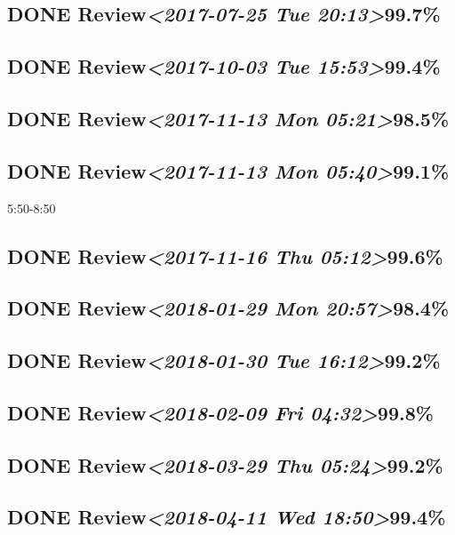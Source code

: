\documentclass[11pt]{ctexart}
\begin{document}
\subsection{{\bfseries\sffamily DONE} Review\textit{<2017-07-25 Tue 20:13>}99.7\%}
\label{sec:org71109af}
\subsection{{\bfseries\sffamily DONE} Review\textit{<2017-10-03 Tue 15:53>}99.4\%}
\label{sec:org5db7d38}

\subsection{{\bfseries\sffamily DONE} Review\textit{<2017-11-13 Mon 05:21>}98.5\%}
\label{sec:org7739807}
\subsection{{\bfseries\sffamily DONE} Review\textit{<2017-11-13 Mon 05:40>}99.1\%}
\label{sec:orgd71cdeb}
5:50-8:50
\subsection{{\bfseries\sffamily DONE} Review\textit{<2017-11-16 Thu 05:12>}99.6\%}
\label{sec:org45613de}
\subsection{{\bfseries\sffamily DONE} Review\textit{<2018-01-29 Mon 20:57>}98.4\%}
\label{sec:org31fd02e}
\subsection{{\bfseries\sffamily DONE} Review\textit{<2018-01-30 Tue 16:12>}99.2\%}
\label{sec:org23d38fd}
\subsection{{\bfseries\sffamily DONE} Review\textit{<2018-02-09 Fri 04:32>}99.8\%}
\label{sec:orgb880fdd}
\subsection{{\bfseries\sffamily DONE} Review\textit{<2018-03-29 Thu 05:24>}99.2\%}
\label{sec:orgd5e2b4f}
\subsection{{\bfseries\sffamily DONE} Review\textit{<2018-04-11 Wed 18:50>}99.4\%}
\label{sec:org30736f9}
\end{document}
